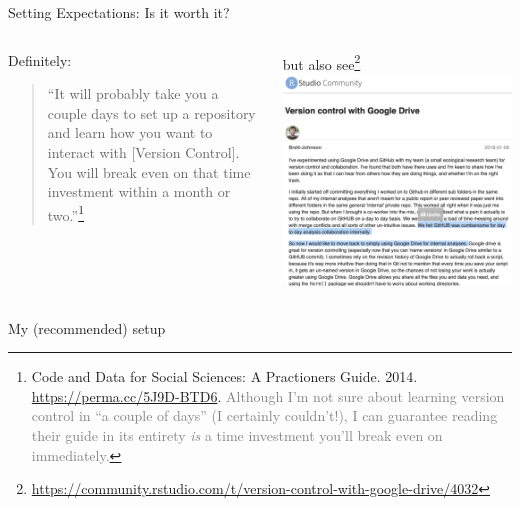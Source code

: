 \documentclass[ignorenonframetext,notes, 10pt, aspectratio=169]{beamer}
\begin{document}
\begin{frame}{Setting Expectations: Is it worth it?}
\begin{columns}[T]
\begin{column}{0.5\textwidth}

Definitely:
\begin{quote}
``It will probably take you a couple days to set up a repository and learn how you want to interact with [Version Control]. You will break even on that time investment within a month or two.''\footnote[frame]{Code and Data for Social Sciences: A Practioners Guide. 2014. \url{https://perma.cc/5J9D-BTD6}.  \textcolor{gray}{Although I'm not sure about learning version control in ``a couple of days'' (I certainly couldn't!), I can guarantee reading their guide in its entirety \emph{is} a time investment you'll break even on immediately.}}
\end{quote}
\end{column}
\begin{column}{0.5\textwidth}
but also see\footnote[frame]{\url{https://community.rstudio.com/t/version-control-with-google-drive/4032}}
\includegraphics[width = 0.8\linewidth]{github_vs_gdrive.png}
\end{column}
\end{columns}
\end{frame}



\begin{frame}{My (recommended) setup}
\end{frame}
\end{document}
